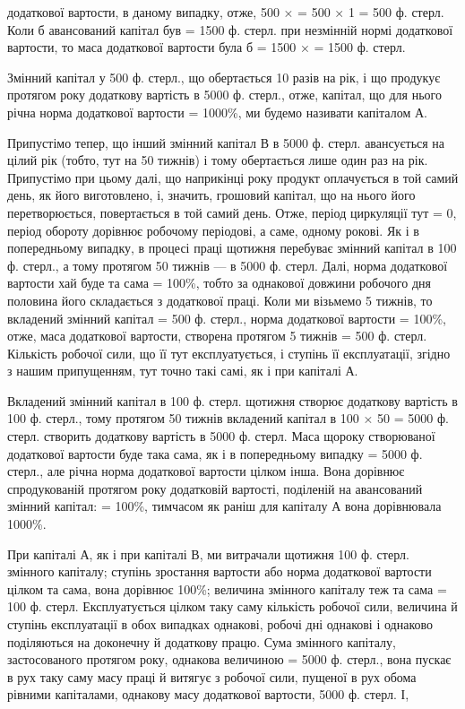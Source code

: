 \parcont{}  %
додаткової вартости, в даному випадку, отже, 500 ×  = 500 × 1 = 500 ф. стерл. Коли б
авансований капітал був = 1500 ф. стерл. при незмінній
нормі додаткової вартости, то маса додаткової вартости була б =
1500 ×  = 1500 ф. стерл.

Змінний капітал у 500 ф. стерл., що обертається 10 разів на рік, і
що продукує протягом року додаткову вартість в 5000 ф. стерл., отже,
капітал, що для нього річна норма додаткової вартости = 1000\%, ми
будемо називати капіталом А.

Припустімо тепер, що інший змінний капітал В в 5000 ф. стерл.
авансується на цілий рік (тобто, тут на 50 тижнів) і тому обертається
лише один раз на рік. Припустімо при цьому далі, що наприкінці року
продукт оплачується в той самий день, як його виготовлено, і, значить,
грошовий капітал, що на нього його перетворюється, повертається в той
самий день. Отже, період циркуляції тут = 0, період обороту дорівнює
робочому періодові, а саме, одному рокові. Як і в попередньому випадку,
в процесі праці щотижня перебуває змінний капітал в 100 ф. стерл.,
а тому протягом 50 тижнів — в 5000 ф. стерл. Далі, норма додаткової
вартости хай буде та сама = 100\%, тобто за однакової довжини робочого
дня половина його складається з додаткової праці. Коли ми візьмемо
5 тижнів, то вкладений змінний капітал = 500 ф. стерл., норма додаткової
вартости = 100\%, отже, маса додаткової вартости, створена протягом
5 тижнів = 500 ф. стерл. Кількість робочої сили, що її тут експлуатується,
і ступінь її експлуатації, згідно з нашим припущенням, тут
точно такі самі, як і при капіталі А.

Вкладений змінний капітал в 100 ф. стерл. щотижня створює додаткову
вартість в 100 ф. стерл., тому протягом 50 тижнів вкладений капітал
в 100 × 50 = 5000 ф. стерл. створить додаткову вартість в 5000 ф. стерл. Маса щороку створюваної
додаткової вартости буде така сама, як і в попередньому випадку = 5000 ф. стерл., але річна норма
додаткової
вартости цілком інша. Вона дорівнює спродукованій протягом року
додатковій вартості, поділеній на авансований змінний капітал:
 = 100\%, тимчасом як раніш для капіталу А вона дорівнювала 1000\%.

При капіталі А, як і при капіталі В, ми витрачали щотижня 100 ф. стерл. змінного капіталу; ступінь
зростання вартости або норма додаткової
вартости цілком та сама, вона дорівнює 100\%; величина змінного
капіталу теж та сама = 100 ф. стерл. Експлуатується цілком таку
саму кількість робочої сили, величина й ступінь експлуатації в обох випадках
однакові, робочі дні однакові і однаково поділяються на доконечну
й додаткову працю. Сума змінного капіталу, застосованого протягом
року, однакова величиною = 5000 ф. стерл., вона пускає в рух таку
саму масу праці й витягує з робочої сили, пущеної в рух обома рівними
капіталами, однакову масу додаткової вартости, 5000 ф. стерл. І,
\parbreak{}  %
